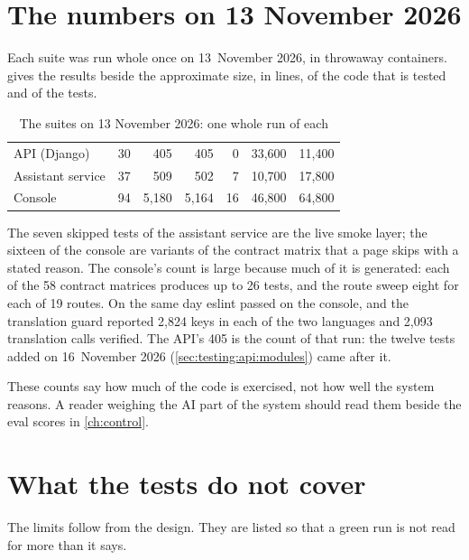\section{The numbers on 13 November 2026}\label{sec:testing:numbers}

Each suite was run whole once on 13~November 2026, in throwaway containers.
 gives the results beside the approximate size, in lines, of the
code that is tested and of the tests.

\begin{table}[H]
\caption{The suites on 13 November 2026: one whole run of each}\label{tab:testing:numbers}
\begin{tabularx}{\textwidth}{@{}Yrrrrrr@{}}
\toprule
{} &  &  &  &  &  &  \\
\midrule
API (Django) & 30 & 405 & 405 & 0 & 33,600 & 11,400 \\
Assistant service & 37 & 509 & 502 & 7 & 10,700 & 17,800 \\
Console & 94 & 5,180 & 5,164 & 16 & 46,800 & 64,800 \\
\bottomrule
\end{tabularx}
\end{table}

The seven skipped tests of the assistant service are the live smoke layer; the sixteen of the
console are variants of the contract matrix that a page skips with a stated reason. The
console's count is large because much of it is generated: each of the 58 contract matrices
produces up to 26 tests, and the route sweep eight for each of 19 routes. On the same day
eslint passed on the console, and the translation guard reported 2,824 keys in each of the two
languages and 2,093 translation calls verified. The API's 405 is the count of that run: the
twelve tests added on 16~November 2026 (\cref{sec:testing:api:modules}) came after it.

These counts say how much of the code is exercised, not how well the system reasons. A reader
weighing the AI part of the system should read them beside the eval scores in
\cref{ch:control}.


\section{What the tests do not cover}\label{sec:testing:gaps}

The limits follow from the design. They are listed so that a green run is not read for more
than it says.

